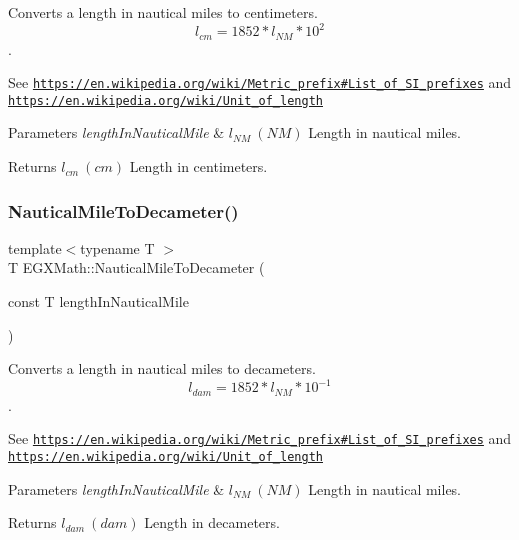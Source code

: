Converts a length in nautical miles to centimeters. \[ l_{cm}=1852 * l_{NM} * 10^{2} \]. 

See \href{https://en.wikipedia.org/wiki/Metric_prefix#List_of_SI_prefixes}{\tt https\+://en.\+wikipedia.\+org/wiki/\+Metric\+\_\+prefix\#\+List\+\_\+of\+\_\+\+S\+I\+\_\+prefixes} and \href{https://en.wikipedia.org/wiki/Unit_of_length}{\tt https\+://en.\+wikipedia.\+org/wiki/\+Unit\+\_\+of\+\_\+length} 
\begin{DoxyParams}{Parameters}
{\em length\+In\+Nautical\+Mile} & $ l_{NM}\ (NM)$ Length in nautical miles. \\
\hline
\end{DoxyParams}
\begin{DoxyReturn}{Returns}
$ l_{cm}\ (cm)$ Length in centimeters. 
\end{DoxyReturn}
\mbox{\label{group___e_g_x_math-_conversions-_length_conversions-_non-_s_i-_nautical_mile-_s_i_gaec7c0bd4b19a2301d5033e19bac6e6eb}} 
\subsubsection{\texorpdfstring{Nautical\+Mile\+To\+Decameter()}{NauticalMileToDecameter()}}
{\footnotesize\ttfamily template$<$typename T $>$ \\
T E\+G\+X\+Math\+::\+Nautical\+Mile\+To\+Decameter (\begin{DoxyParamCaption}\item[{const T}]{length\+In\+Nautical\+Mile }\end{DoxyParamCaption})}



Converts a length in nautical miles to decameters. \[ l_{dam}=1852 * l_{NM} * 10^{-1} \]. 

See \href{https://en.wikipedia.org/wiki/Metric_prefix#List_of_SI_prefixes}{\tt https\+://en.\+wikipedia.\+org/wiki/\+Metric\+\_\+prefix\#\+List\+\_\+of\+\_\+\+S\+I\+\_\+prefixes} and \href{https://en.wikipedia.org/wiki/Unit_of_length}{\tt https\+://en.\+wikipedia.\+org/wiki/\+Unit\+\_\+of\+\_\+length} 
\begin{DoxyParams}{Parameters}
{\em length\+In\+Nautical\+Mile} & $ l_{NM}\ (NM)$ Length in nautical miles. \\
\hline
\end{DoxyParams}
\begin{DoxyReturn}{Returns}
$ l_{dam}\ (dam)$ Length in decameters. 
\end{DoxyReturn}
\mbox{\label{group___e_g_x_math-_conversions-_length_conversions-_non-_s_i-_nautical_mile-_s_i_gabd0d42a12028a741852737b122d60f28}} 
